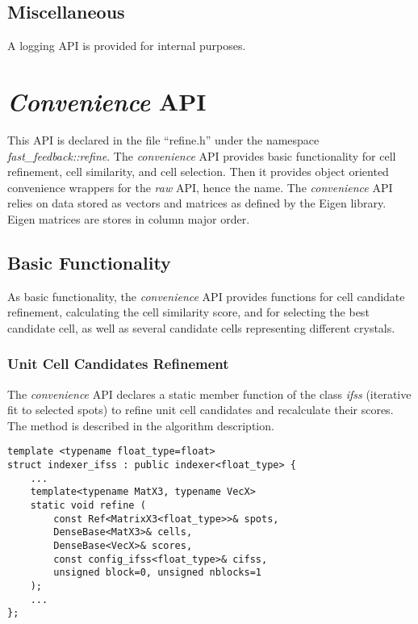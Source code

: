 \documentclass[a4paper,10pt]{article}
\begin{document}
\subsection{Miscellaneous}

A logging API is provided for internal purposes.

\section{\emph{Convenience} API}

This API is declared in the file ``refine.h'' under the namespace \emph{fast\_feed\-back::re\-fine}. The \emph{convenience} API provides basic functionality for cell refinement, cell similarity, and cell selection. Then it provides object oriented convenience wrappers for the \emph{raw} API, hence the name. The \emph{convenience} API relies on data stored as vectors and matrices as defined by the Eigen library. Eigen matrices are stores in column major order.

\subsection{Basic Functionality}

As basic functionality, the \emph{convenience} API provides functions for cell candidate refinement, calculating the cell similarity score, and for selecting the best candidate cell, as well as several candidate cells representing different crystals.

\subsubsection{Unit Cell Candidates Refinement}

The \emph{convenience} API declares a static member function of the class \emph{ifss} (iterative fit to selected spots) to refine unit cell candidates and recalculate their scores. The method is described in the algorithm description.

\begin{lstlisting}
template <typename float_type=float>
struct indexer_ifss : public indexer<float_type> {
    ...
    template<typename MatX3, typename VecX>
    static void refine (
        const Ref<MatrixX3<float_type>>& spots,
        DenseBase<MatX3>& cells,
        DenseBase<VecX>& scores,
        const config_ifss<float_type>& cifss,
        unsigned block=0, unsigned nblocks=1
    );
    ...
};
\end{lstlisting}
\end{document}
